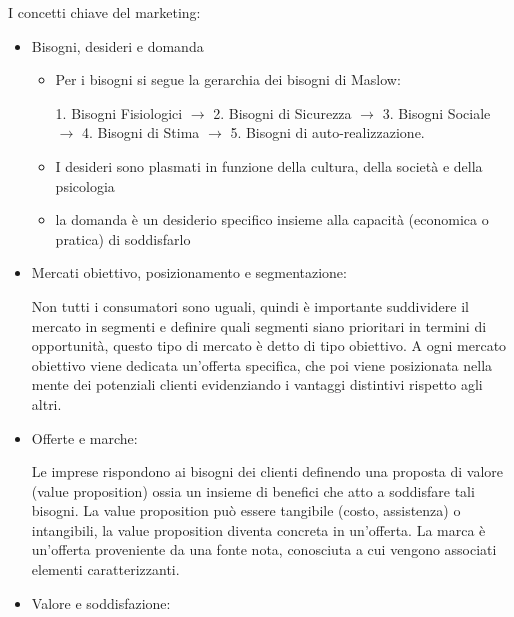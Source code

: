 \documentclass[11pt]{article}
\begin{document}
\noindent I concetti chiave del marketing: 
\begin{itemize}[topsep=0ex]
	\item Bisogni, desideri e domanda
	\begin{itemize}[topsep=0ex,noitemsep]
		\item Per i bisogni si segue la gerarchia dei bisogni di Maslow:
		
		1. Bisogni Fisiologici $\to$ 2. Bisogni di Sicurezza 
		$\to$ 3. Bisogni Sociale $\to$ 4. Bisogni di Stima $\to$
		5. Bisogni di auto-realizzazione.
		
		\item I desideri sono plasmati in funzione della cultura, della società e della psicologia
		\item la domanda è un desiderio specifico insieme alla capacità (economica o pratica) di soddisfarlo
	\end{itemize}
	\item Mercati obiettivo, posizionamento e segmentazione:
	
	Non tutti i consumatori sono uguali, quindi è importante suddividere il mercato in segmenti e definire quali segmenti siano prioritari in termini di opportunità, questo tipo di mercato è detto di tipo obiettivo. A ogni mercato obiettivo viene dedicata un'offerta specifica, che poi viene posizionata nella mente dei potenziali clienti evidenziando i vantaggi distintivi rispetto agli altri.
	\item Offerte e marche:
	
	Le imprese rispondono ai bisogni dei clienti definendo una proposta di valore (value proposition) ossia un insieme di benefici che atto a soddisfare tali bisogni. La value proposition può essere tangibile (costo, assistenza) o intangibili, la value proposition diventa concreta in un'offerta. La marca è un'offerta proveniente da una fonte nota, conosciuta a cui vengono associati elementi caratterizzanti.
	\item Valore e soddisfazione:
	

\end{itemize}
\end{document}
